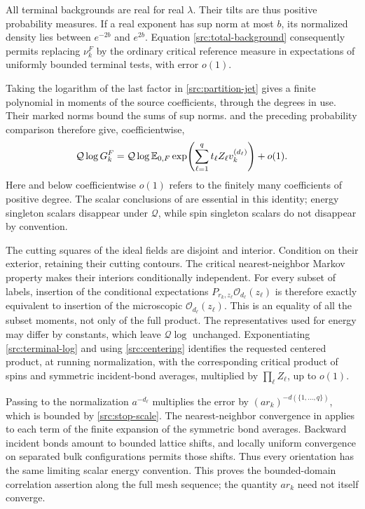 All terminal backgrounds are real for real $\lambda$. Their tilts are
thus positive probability measures. If a real exponent has sup norm
at most $b$, its normalized density lies between $e^{-2b}$ and $e^{2b}$.
Equation \eqref{src:total-background} consequently permits replacing
$\nu_k^F$ by the ordinary critical reference measure in expectations
of uniformly bounded terminal tests, with error $o(1)$.

Taking the logarithm of the last factor in
\eqref{src:partition-jet} gives a finite polynomial in moments of the
source coefficients, through the degrees in use. Their marked norms
bound the sums of sup norms.  and the preceding
probability comparison therefore give, coefficientwise,
\begin{equation}
 \mathcal Q\log G_k^F
 =\mathcal Q\log {\mathbb E}_{0,F}
      \exp\!\left(\sum_{\ell=1}^q
                t_\ell Z_\ell v_k^{(d_\ell)}\right)+o(1).
 \label{src:terminal-log}
\end{equation}
Here and below coefficientwise $o(1)$ refers to the finitely many
coefficients of positive degree. The scalar conclusions of
 are essential in this identity; energy singleton
scalars disappear under $\mathcal Q$, while spin singleton scalars do
not disappear by convention.

The cutting squares of the ideal fields are disjoint and interior.
Condition on their exterior, retaining their cutting contours. The
critical nearest-neighbor Markov property makes their interiors
conditionally independent. For every subset of labels, insertion of
the conditional expectations $P_{r_k,z_\ell}\mathcal O_{d_\ell}(z_\ell)$ is
therefore exactly equivalent to insertion of the microscopic
$\mathcal O_{d_\ell}(z_\ell)$. This is an equality of all the subset moments,
not only of the full product. The representatives used for energy may
differ by constants, which leave $\mathcal Q\log$ unchanged.
Exponentiating \eqref{src:terminal-log} and using
\eqref{src:centering} identifies the requested centered product, at
running normalization, with the corresponding critical product of
spins and symmetric incident-bond averages, multiplied by
$\prod_\ell Z_\ell$, up to $o(1)$.

Passing to the normalization $a^{-d_\ell}$ multiplies the error by
$(a r_k)^{-d(\{1,\ldots,q\})}$, which is bounded by
\eqref{src:stop-scale}. The nearest-neighbor convergence in
 applies to each term of the finite expansion of the
symmetric bond averages. Backward incident bonds amount to bounded
lattice shifts, and locally uniform convergence on separated bulk
configurations permits those shifts. Thus every orientation has the
same limiting scalar energy convention. This proves the bounded-domain
correlation assertion along the full mesh sequence; the quantity
$a r_k$ need not itself converge.

